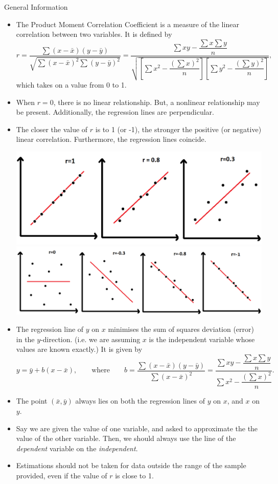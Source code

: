 \documentclass[../Notes.tex]{subfiles}
\begin{document}
\begin{stbox}{General Information}
  \begin{itemize}
    \item The Product Moment Correlation Coefficient is a measure of the linear correlation between two variables. It is defined by
    \[r=\frac{\sum{(x-\bar{x})(y-\bar{y})}}{\sqrt{\sum{(x-\bar{x})^2}\sum{(y-\bar{y})^2}}}=\frac{\sum{xy}-\dfrac{\sum{x}\sum{y}}{n}}{\sqrt{\left[\sum{x^2}-\dfrac{\left(\sum{x}\right)^2}{n}\right]\left[\sum{y^2}-\dfrac{\left(\sum{y}\right)^2}{n}\right]}},\]
    which takes on a value from 0 to 1.
    \item When \(r=0\), there is no linear relationship. But, a nonlinear relationship may be present. Additionally, the regression lines are perpendicular.
    \item The closer the value of \(r\) is to 1 (or -1), the stronger the positive (or negative) linear correlation. Furthermore, the regression lines coincide.
    \begin{center}
      \includegraphics[scale=0.3]{../images/Product Moment Correlation Coefficient 1.png}
      \includegraphics[scale=0.4]{../images/Product Moment Correlation Coefficient 2.png}
    \end{center}
    \item The regression line of \(y\) on \(x\) minimises the sum of squares deviation (error) in the \(y\)-direction. (i.e. we are assuming \(x\) is the independent variable whose values are known exactly.) It is given by
    \[y=\bar{y}+b(x-\bar{x}),\qquad\text{where}\qquad b=\frac{\sum{(x-\bar{x})(y-\bar{y})}}{\sum{(x-\bar{x})^2}}=\frac{\sum{xy}-\dfrac{\sum{x}\sum{y}}{n}}{\sum{x^2}-\dfrac{\left(\sum{x}\right)^2}{n}}.\] 
    \item The point \((\bar{x},\bar{y})\) always lies on both the regression lines of \(y\) on \(x\), and \(x\) on \(y\).
    \item Say we are given the value of one variable, and asked to approximate the the value of the other variable. Then, we should always use the line of the \emph{dependent} variable on the \emph{independent}.
    \item Estimations should not be taken for data outside the range of the sample provided, even if the value of \(r\) is close to 1.
  \end{itemize}
\end{stbox}
\end{document}
